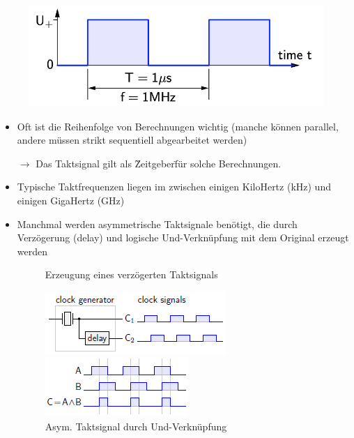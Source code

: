 \documentclass[12pt]{report}
\begin{document}
\begin{figure}[H]
\begin{minipage}[t]{0.45\textwidth}
    \begin{center}
      \includegraphics[width=\textwidth]{../graphics/taktsignal_02.png}
    \end{center}
  \end{minipage}
\end{figure}

\begin{infobox}
  \begin{itemize}
    \item Oft ist die Reihenfolge von Berechnungen wichtig (manche können parallel, andere müssen strikt sequentiell abgearbeitet werden)
          \par $\rightarrow$ Das Taktsignal gilt als \"Zeitgeber\" für solche Berechnungen.
    \item Typische Taktfrequenzen liegen im zwischen einigen KiloHertz (kHz) und einigen GigaHertz (GHz)
    \item Manchmal werden asymmetrische Taktsignale benötigt, die durch Verzögerung (delay) und logische Und-Verknüpfung mit dem Original erzeugt werden
          \begin{figure}[H]
            \begin{minipage}[t]{0.45\textwidth}
              \caption{Erzeugung eines verzögerten Taktsignals}
              \begin{center}
                \includegraphics{taktsignal_asymmetrisch.png}
              \end{center}
            \end{minipage}
            \hfill
            \begin{minipage}[t]{0.45\textwidth}
              \caption{Asym. Taktsignal durch Und-Verknüpfung}
              \begin{center}
                \includegraphics{taktsignal_asymmetrisch_02.png}
              \end{center}
            \end{minipage}
          \end{figure}
  \end{itemize}
\end{infobox}
\end{document}

